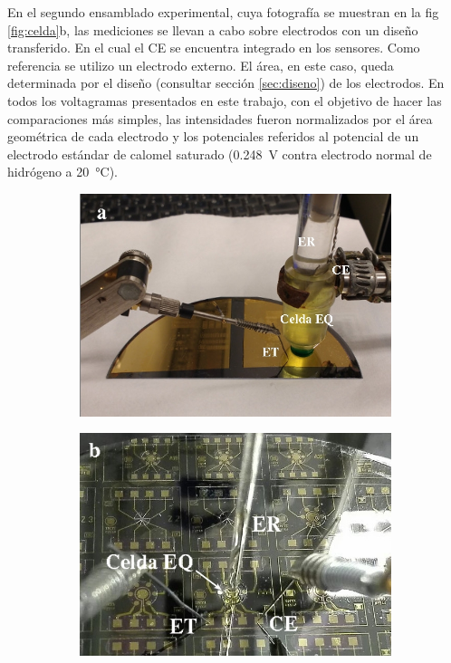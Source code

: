              En el segundo ensamblado experimental, cuya fotografía se muestran en la fig \ref{fig:celda}b, las mediciones se llevan a cabo sobre electrodos con un diseño transferido. En el cual el CE se encuentra integrado en los sensores. Como referencia se utilizo un electrodo externo. El área, en este caso, queda determinada por el diseño (consultar sección \ref{sec:diseno}) de los electrodos. En todos los voltagramas presentados en este trabajo, con el objetivo de hacer las comparaciones más simples, las intensidades fueron normalizados por el área geométrica de cada electrodo y los potenciales referidos al potencial de un electrodo estándar de calomel saturado (\SI{0.248}{\volt} contra electrodo normal de hidrógeno a \SI{20}{\celsius})\cite{BANUS1941}.


			 \begin{figure}[b!]
			  		 \begin{subfigure}[t]{0.495\textwidth}
			  		  \includegraphics[width=\textwidth]{Imagenes/EQ1.jpg}
			  		  \end{subfigure}
			  		  \begin{subfigure}[t]{0.495\textwidth}
			  		  \includegraphics[width=\textwidth]{Imagenes/EQ2.jpg}

\end{subfigure}
\end{figure}
